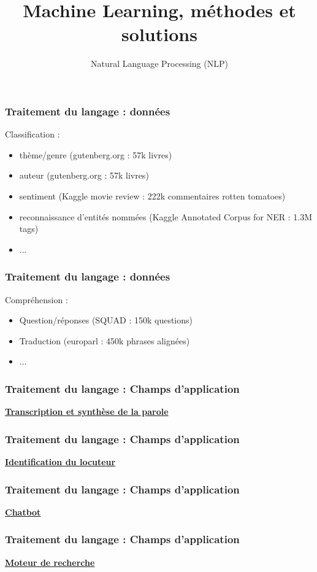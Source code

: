 \documentclass{formation}
\title{Machine Learning, méthodes et solutions}
\subtitle{Natural Language Processing (NLP)}
\begin{document}
\maketitle

\begin{frame}
  \frametitle{Traitement du langage : données}
  Classification :
  \begin{itemize}
  \item thème/genre (gutenberg.org : 57k livres)
  \item auteur (gutenberg.org : 57k livres)
  \item sentiment (Kaggle movie review : 222k commentaires rotten tomatoes)
  \item reconnaissance d'entités nommées (Kaggle Annotated Corpus for NER : 1.3M tags)
  \item ...
  \end{itemize}
\end{frame}

\begin{frame}
  \frametitle{Traitement du langage : données}
  Compréhension :
  \begin{itemize}
  \item Question/réponses (SQUAD : 150k questions)
  \item Traduction (europarl : 450k phrases alignées)
  \item ...
  \end{itemize}
\end{frame}

\begin{frame}
  \frametitle{Traitement du langage : Champs d'application}
  \underline{\textbf{Transcription et synthèse de la parole}}
\end{frame}

\begin{frame}
  \frametitle{Traitement du langage : Champs d'application}
  \underline{\textbf{Identification du locuteur}}
\end{frame}

\begin{frame}
  \frametitle{Traitement du langage : Champs d'application}
  \underline{\textbf{Chatbot}}
\end{frame}

\begin{frame}
  \frametitle{Traitement du langage : Champs d'application}
  \underline{\textbf{Moteur de recherche}}
\end{frame}
\end{document}
